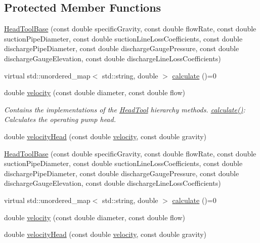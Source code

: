 \subsection*{Protected Member Functions}
\begin{DoxyCompactItemize}
\item 
\hyperlink{class_head_tool_base_ae5bb2325e1266c64b16937d964aea14f}{Head\+Tool\+Base} (const double specific\+Gravity, const double flow\+Rate, const double suction\+Pipe\+Diameter, const double suction\+Line\+Loss\+Coefficients, const double discharge\+Pipe\+Diameter, const double discharge\+Gauge\+Pressure, const double discharge\+Gauge\+Elevation, const double discharge\+Line\+Loss\+Coefficients)
\item 
virtual std\+::unordered\+\_\+map$<$ std\+::string, double $>$ \hyperlink{class_head_tool_base_ab8df8f908827ce45dc5e769ea0e10f0b}{calculate} ()=0
\item 
double \hyperlink{class_head_tool_base_ab79bb695c514b740d9ea01df60b68a23}{velocity} (const double diameter, const double flow)
\begin{DoxyCompactList}\small\item\em Contains the implementations of the \hyperlink{class_head_tool}{Head\+Tool} hierarchy methods. \hyperlink{class_head_tool_base_ab8df8f908827ce45dc5e769ea0e10f0b}{calculate()}\+: Calculates the operating pump head. \end{DoxyCompactList}\item 
double \hyperlink{class_head_tool_base_a1dbece05fc1a248fa2aa64b6f09602f6}{velocity\+Head} (const double \hyperlink{class_head_tool_base_ab79bb695c514b740d9ea01df60b68a23}{velocity}, const double gravity)
\item 
\hyperlink{class_head_tool_base_ae5bb2325e1266c64b16937d964aea14f}{Head\+Tool\+Base} (const double specific\+Gravity, const double flow\+Rate, const double suction\+Pipe\+Diameter, const double suction\+Line\+Loss\+Coefficients, const double discharge\+Pipe\+Diameter, const double discharge\+Gauge\+Pressure, const double discharge\+Gauge\+Elevation, const double discharge\+Line\+Loss\+Coefficients)
\item 
virtual std\+::unordered\+\_\+map$<$ std\+::string, double $>$ \hyperlink{class_head_tool_base_ab8df8f908827ce45dc5e769ea0e10f0b}{calculate} ()=0
\item 
double \hyperlink{class_head_tool_base_ab79bb695c514b740d9ea01df60b68a23}{velocity} (const double diameter, const double flow)
\item 
double \hyperlink{class_head_tool_base_a1dbece05fc1a248fa2aa64b6f09602f6}{velocity\+Head} (const double \hyperlink{class_head_tool_base_ab79bb695c514b740d9ea01df60b68a23}{velocity}, const double gravity)

\end{DoxyCompactItemize}
